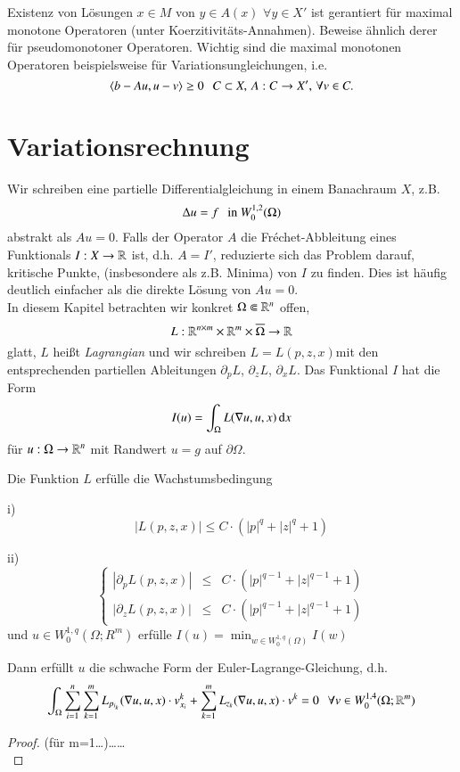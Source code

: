Existenz von Lösungen $x\in M$ von $y\in A(x)$ $\forall y\in X'$ ist gerantiert für maximal monotone
Operatoren (unter Koerzitivitäts-Annahmen). Beweise ähnlich derer für pseudomonotoner Operatoren.
Wichtig sind die maximal monotonen Operatoren beispielsweise für Variationsungleichungen, i.e.
\[
    \langle b-Au,u-v\rangle \geq 0 \hspace{.25cm} C\subset X, \, A:C\rightarrow X',\, \forall v\in C.
\]

\section{Variationsrechnung}

Wir schreiben eine partielle Differentialgleichung in einem Banachraum $X$, z.B.
\[
    \Delta u = f \hspace{.25cm} \text{in }W_0^{1,2}(\Omega)
\]
abstrakt als $Au=0$. Falls der Operator $A$ die Fréchet-Abbleitung eines Funktionals $I:X\rightarrow\mathbb{R}$ ist,
d.h. $A=I'$, reduzierte sich das Problem darauf, kritische Punkte, (insbesondere als z.B. Minima) von
$I$ zu finden. Dies ist häufig deutlich einfacher als die direkte Lösung von $Au=0$.\\
\noindent In diesem Kapitel betrachten wir konkret $\Omega \Subset \mathbb{R}^n$ offen,
\[
    L:\mathbb{R}^{n\times m} \times \mathbb{R}^m \times \overline \Omega \rightarrow \mathbb{R}
\]
glatt, $L$ heißt \textit{Lagrangian} und wir schreiben $L= L(p,z,x)$mit den entsprechenden partiellen
Ableitungen $\partial_p L$, $\partial_zL$, $\partial_x L$. Das Funktional $I$ hat die Form
\[
    I(u)=\int_\Omega L(\nabla u , u , x) \, \mathrm{d} x
\]
für $u:\Omega\rightarrow \mathbb{R}^n$ mit Randwert $u=g$ auf $\partial \Omega$.

\begin{theorem}\label{5.1}
    Die Funktion $L$ erfülle die Wachstumsbedingung
    \begin{description}
    \item{i)}
    \[|L(p,z,x)|\leq C\cdot(|p|^q+|z|^q+1) \]
    \item{ii)}
    \[
        \left\{ \begin{array}{lcr} |\partial_pL(p,z,x)|&\leq& C\cdot (|p|^{q-1}+|z|^{q-1}+1)\\
                |\partial _z L(p,z,x)|&\leq& C\cdot(|p|^{q-1}+ |z|^{q-1} + 1) \end{array}\right.
    \]
    und $u \in W_0^{1,q}(\Omega;R^m)$ erfülle $I(u)=\min_{w\in W_0^{1,q}(\Omega)}I(w)$
    \end{description}
    Dann erfüllt $u$ die schwache Form der Euler-Lagrange-Gleichung, d.h.
    \[
        \int_\Omega \sum_{i=1}^n\sum_{k=1}^m L_{p_{i_k}} (\nabla u , u , x) \cdot v_{x_i}^k
        +\sum_{k=1}^m L_{z_k}(\nabla u, u ,x) \cdot v^k =0 \hspace{.25cm} \forall v\in W_0^{1,4}(\Omega;\mathbb{R}^m)
    \]
\end{theorem}


\begin{proof}
    (für m=1…)…… \[ \]
\end{proof}
